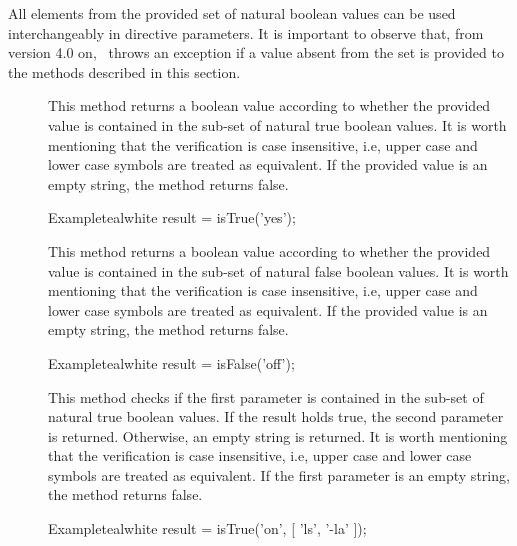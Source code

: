\vspace{1.4em}

All elements from the provided set of natural boolean values can be used interchangeably in directive parameters. It is important to observe that, from version 4.0 on, \arara\ throws an exception if a value absent from the set is provided to the methods described in this section.

\begin{description}
\item[] This method returns a boolean value according to whether the provided  value is contained in the sub-set of natural true boolean values. It is worth mentioning that the verification is case insensitive, i.e, upper case and lower case symbols are treated as equivalent. If the provided value is an empty string, the method returns false.

\begin{codebox}{Example}{teal}{\icnote}{white}
result = isTrue('yes');
\end{codebox}

\item[] This method returns a boolean value according to whether the provided  value is contained in the sub-set of natural false boolean values. It is worth mentioning that the verification is case insensitive, i.e, upper case and lower case symbols are treated as equivalent. If the provided value is an empty string, the method returns false.

\begin{codebox}{Example}{teal}{\icnote}{white}
result = isFalse('off');
\end{codebox}

\item[] This method checks if the first parameter is contained in the sub-set of natural true boolean values. If the result holds true, the second parameter is returned. Otherwise, an empty string is returned. It is worth mentioning that the verification is case insensitive, i.e, upper case and lower case symbols are treated as equivalent. If the first parameter is an empty string, the method returns false.

\begin{codebox}{Example}{teal}{\icnote}{white}
result = isTrue('on', [ 'ls', '-la' ]);
\end{codebox}


\end{description}
